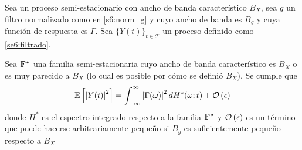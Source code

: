 \begin{teorema}
Sea \xt un proceso semi-estacionario con ancho de banda característico $B_X$, sea $g$ un filtro normalizado como en \ref{s6:norm_g} y cuyo ancho de banda es $B_g$ y cuya función de respuesta es $\Gamma$. 
%
Sea $\{Y(t)\}_{t\in \mathcal{T}}$ un proceso definido como \ref{se6:filtrado}.

Sea $\mathbf{F}^{\boldsymbol{*}}$ una familia semi-estacionaria cuyo ancho de banda característico es $B_X$ o es muy parecido a $B_X$ (lo cual es posible por cómo se definió $B_X$).
Se cumple que
\begin{equation}
\mathrm{E}\left[ \left| Y(t) \right|^{2} \right] = \int_{-\infty}^{\infty} \left| \Gamma(\omega) \right|^{2} dH^{*}(\omega; t) + \mathcal{O}\left( \epsilon \right)
\end{equation}
donde $H^{*}$ es el espectro integrado respecto a la familia $\mathbf{F}^{\boldsymbol{*}}$ y $\mathcal{O}\left( \epsilon \right)$ es un término que puede hacerse arbitrariamente pequeño si $B_g$ es suficientemente pequeño respecto a $B_X$
\label{teo:aprox_orden}
\end{teorema}

